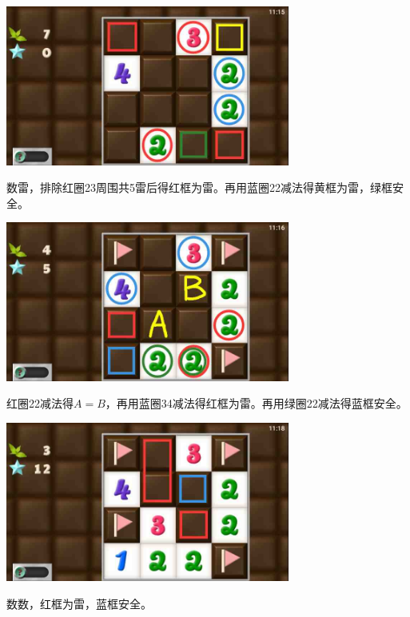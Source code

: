 \subsection{} %
\begin{center}
    \includegraphics[width=0.7\textwidth]{puzzlelow/129-1.jpg}
\end{center}
数雷，排除红圈23周围共5雷后得红框为雷。再用蓝圈22减法得黄框为雷，绿框安全。
\begin{center}
    \includegraphics[width=0.7\textwidth]{puzzlelow/129-2.jpg}
\end{center}
红圈22减法得$A=B$，再用蓝圈34减法得红框为雷。再用绿圈22减法得蓝框安全。
\begin{center}
    \includegraphics[width=0.7\textwidth]{puzzlelow/129-3.jpg}
\end{center}
数数，红框为雷，蓝框安全。

